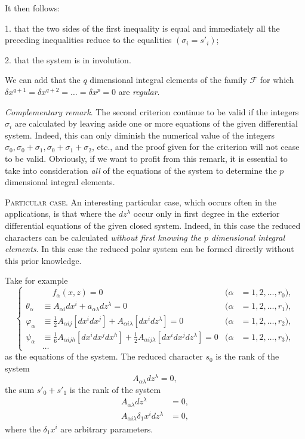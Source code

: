 It then follows:

1. that the two sides of the first inequality is equal and immediately all the preceding inequalities reduce to the equalities $(\sigma_{i}=s'_{i})$;

2. that the system is in involution.

We can add that the $q$ dimensional integral elements of the family $\mathcal{F}$ for which $\delta x^{q+1}=\delta x^{q+2}=\dots=\delta x^{p}=0$ are \emph{regular}.


\vspace{12pt}\fsec \emph{Complementary remark}. The second criterion continue to be valid if the integers $\sigma_{i}$ are calculated by leaving aside one or more equations of the given differential system. Indeed, this can only diminish the numerical value of the integers $\sigma_{0},\sigma_{0}+\sigma_{1},\sigma_{0}+\sigma_{1}+\sigma_{2}$, etc., and the proof given for the criterion will not cease to be valid. Obviously, if we want to profit from this remark, it is essential to take into consideration \emph{all} of the equations of the system to determine the $p$ dimensional integral elements.

\vspace{12pt}\fsec \textsc{Particular case}. An interesting particular case, which occurs often  in the applications, is that where the $dz^{\lambda}$ occur only in first degree in the exterior differential equations of the given closed system. Indeed, in this case the reduced characters can be calculated \emph{without first knowing the $p$ dimensional integral elements}. In this case the reduced polar system can be formed directly without this prior knowledge.

Take for example
\begin{equation}
  \label{eq:5.1}
  \left\{
  \begin{aligned}
    &\quad\ f_{\alpha}(x,z)=0&(\alpha&=1,2,\dots,r_{0}),\\
    \theta_{\alpha}&\equiv A_{\alpha i}dx^{i}+a_{\alpha\lambda}dz^{\lambda}=0&(\alpha&=1,2,\dots,r_{1}),\\
    \varphi_{\alpha}&\equiv \frac{1}{2}A_{\alpha ij}[dx^{i}dx^{j}]+A_{\alpha i \lambda}[dx^{i}dz^{\lambda}]=0&(\alpha&=1,2,\dots,r_{2}),\\
    \psi_{\alpha}&\equiv \frac{1}{6}A_{\alpha ijh}[dx^{i}dx^{j}dx^{h}]+\frac{1}{2}A_{\alpha ij\lambda}[dx^{i}dx^{j}dz^{\lambda}]=0&(\alpha&=1,2,\dots,r_{3}),\\
    &\dots
  \end{aligned}    
  \right.
\end{equation}
as the equations of the system. The reduced character $s_{0}$ is the rank of the system 
\[
A_{\alpha\lambda}dz^{\lambda}=0,
\]
the sum $s'_{0}+s'_{1}$ is the rank of the system
\begin{align*}
  A_{\alpha\lambda}dz^{\lambda}&=0,\\
  A_{\alpha i \lambda}\delta_{1}x^{i}dz^{\lambda}&=0,
\end{align*}
where the $\delta_{1}x^{i}$ are arbitrary parameters.

